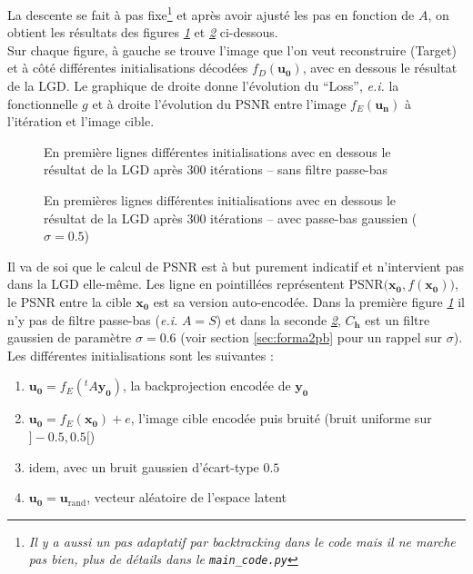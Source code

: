 \documentclass[hidelinks, french]{article} %
\newcommand{\ei}{\textit{e.i. }}
\renewcommand{\bf}[1]{\boldsymbol{#1}}
\theoremstyle{enonce}
\theoremstyle{special}
\theoremstyle{rq}
\theoremstyle{exo}
\theoremstyle{demo}
\begin{document}
La descente se fait à pas fixe\footnote{\emph{Il y a aussi un pas adaptatif par backtracking dans le code mais il ne marche pas bien, plus de détails dans le \texttt{main\_code.py}}} et après avoir ajusté les pas en fonction de $A$, on obtient les résultats des figures \textit{\ref{fig:LGDinits}} et \textit{\ref{fig:LGDinitg}} ci-dessous.
\\
Sur chaque figure, à gauche se trouve l'image que l'on veut reconstruire (Target) et à côté différentes initialisations décodées $f_D(\bf{u_0})$, avec en dessous le résultat de la LGD.
Le graphique de droite donne l'évolution du ``Loss'', \ei la fonctionnelle $g$ et à droite l'évolution du PSNR entre l'image $f_E(\bf{u_n})$ à l'itération et l'image cible.
\begin{figure}[H]\centering
	
	\caption{En première lignes différentes initialisations avec en dessous le résultat de la LGD après 300 itérations -- sans filtre passe-bas}
	\label{fig:LGDinits}
\end{figure}

\begin{figure}[H]\centering
	
	\caption{En premières lignes différentes initialisations avec en dessous le résultat de la LGD après 300 itérations --  avec passe-bas gaussien ($\sigma=0.5$)}
	\label{fig:LGDinitg}
\end{figure}

Il va de soi que le calcul de PSNR est à but purement indicatif et n'intervient pas dans la LGD elle-même. Les ligne en pointillées représentent PSNR$\big(\bf{x_0},f(\bf{x_0})\big)$, le PSNR entre la cible $\bf{x_0}$ est sa version auto-encodée.
Dans la première figure \textit{\ref{fig:LGDinits}} il n'y pas de filtre passe-bas (\ei $A=S$) et dans la seconde \textit{\ref{fig:LGDinitg}}, $C_{\bf{h}}$ est un filtre gaussien de paramètre $\sigma=0.6$ (voir section \ref{sec:forma2pb} pour un rappel sur $\sigma$).
\\
Les différentes initialisations sont les suivantes :
\begin{enumerate}[label=(\arabic*)]
	\item $\bf{u_0}=f_E(^tA\bf{y_0})$, la backprojection encodée de $\bf{y_0}$
	\item $\bf{u_0}=f_E(\bf{x_0})+e$, l'image cible encodée puis bruité (bruit uniforme sur $]-0.5,0.5[$)
	\item idem, avec un bruit gaussien d'écart-type $0.5$
	\item $\bf{u_0}=\bf{u}_{\text{rand}}$,  vecteur aléatoire de l'espace latent
\end{enumerate}
\end{document}
